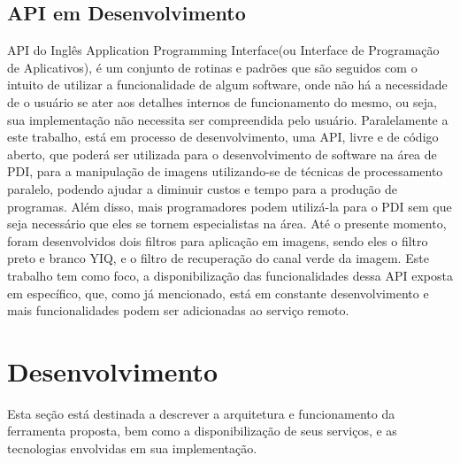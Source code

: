 \documentclass[12pt]{article}
\begin{document}
\subsection{API em Desenvolvimento}

API do Inglês Application Programming Interface(ou Interface de Programação de Aplicativos), é um conjunto de rotinas e padrões que são seguidos com o intuito de utilizar a funcionalidade de algum software, onde não há a necessidade de o usuário se ater aos detalhes internos de funcionamento do mesmo, ou seja, sua implementação não necessita ser compreendida pelo usuário. 
Paralelamente a este trabalho, está em processo de desenvolvimento, uma API, livre e de código aberto, que poderá ser utilizada para o desenvolvimento de software na área de PDI, para a manipulação de imagens utilizando-se de técnicas de processamento paralelo, podendo ajudar a diminuir custos e tempo para a produção de programas. Além disso, mais programadores podem utilizá-la para o PDI sem que seja necessário que eles se tornem especialistas na área.
Até o presente momento, foram desenvolvidos dois filtros para aplicação em imagens, sendo eles o filtro preto e branco YIQ, e o filtro de recuperação do canal verde da imagem. Este trabalho tem como foco, a disponibilização das funcionalidades dessa API exposta em específico, que, como já mencionado, está em constante desenvolvimento e mais funcionalidades podem ser adicionadas ao serviço remoto.

\section{Desenvolvimento}

Esta seção está destinada a descrever a arquitetura e funcionamento da ferramenta proposta, bem como a disponibilização de seus serviços, e as tecnologias envolvidas em sua implementação.


\end{document}
